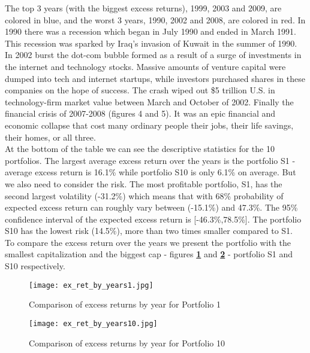 \documentclass[11pt]{article}
\begin{document}
The top 3 years (with the biggest excess returns), 1999, 2003 and 2009, are colored in blue, and the worst 3 years, 1990, 2002 and 2008, are colored in red. 
In 1990 there was a recession which began in July 1990 and ended in March 1991. This recession was sparked by Iraq's invasion of Kuwait in the summer of 1990. 
In 2002 burst the dot-com bubble formed as a result of a surge of investments in the internet and technology stocks. Massive amounts of venture capital were dumped 
into tech and internet startups, while investors purchased shares in these companies on the hope of success. The crash wiped out \$5 trillion U.S. in technology-firm 
market value between March and October of 2002. Finally the financial crisis of 2007-2008 (figures 4 and 5). It was an epic financial and economic collapse that cost 
many ordinary people their jobs, their life savings, their homes, or all three.\\
At the bottom of the table we can see the descriptive statistics for the 10 portfolios. The largest average excess return over the years is the portfolio 
S1 - average excess return is 16.1\% while portfolio S10 is only 6.1\% on average. But we also need to consider the risk. The most profitable portfolio, 
S1, has the second largest volatility (-31.2\%) which means that with 68\% probability of expected excess return can roughly vary between (-15.1\%) and 47.3\%. 
The 95\% confidence interval of the expected excess return is [-46.3\%,78.5\%]. The portfolio S10 has the lowest risk (14.5\%), more than two times smaller compared to S1.\\
To compare the excess return over the years we present the portfolio with the smallest capitalization and the biggest cap - figures \textbf{\ref{fig:ex_ret_by_years1}} and 
\textbf{\ref{fig:ex_ret_by_years10}} - portfolio S1 and S10 respectively.

\begin{figure}[H]
    \centering
        \centering
        \texttt{[image: ex\_ret\_by\_years1.jpg]}
        \caption{Comparison of excess returns by year for Portfolio 1}
        \label{fig:ex_ret_by_years1}
\end{figure}
    \begin{figure}[H]
        \centering
        \texttt{[image: ex\_ret\_by\_years10.jpg]}
        \caption{Comparison of excess returns by year for Portfolio 10}
        \label{fig:ex_ret_by_years10}
\end{figure}
\clearpage

\end{document}
